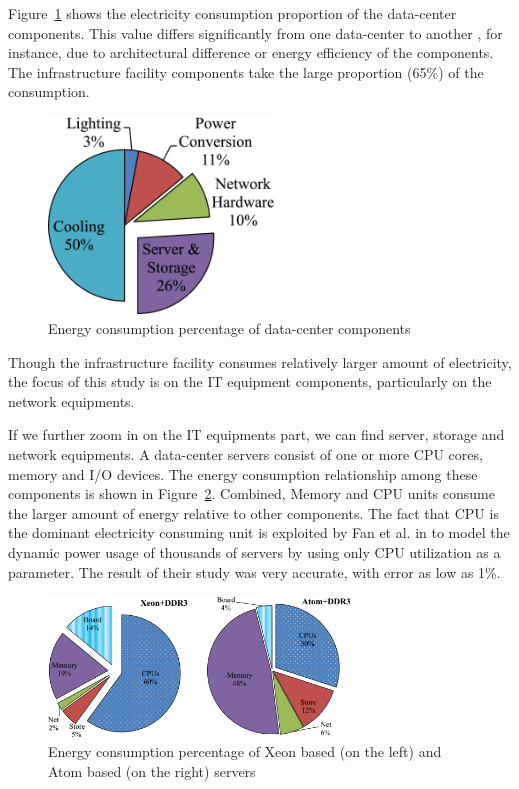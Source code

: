 Figure~\ref{fig:datacenterenergy} \cite{DBLP:journals/comsur/DayarathnaWF16} shows the electricity consumption proportion of the data-center components. This value differs significantly from one data-center to another \cite{DBLP:series/synthesis/2013Barroso}, for instance, due to architectural difference\cite{DBLP:conf/eenergy/GyarmatiT10} or energy efficiency of the components. The infrastructure facility components take the large proportion (65\%) of the consumption. 

\begin{figure}[ht]
	\begin{center}
		\includegraphics[width=6cm]{images/datacenterenergy.png}
		\caption{Energy consumption percentage of data-center components}
		\label{fig:datacenterenergy}
	\end{center}
\end{figure}
Though the infrastructure facility consumes relatively larger amount of electricity, the focus of this study is on the IT equipment components, particularly on the network equipments. 

If we further zoom in on the IT equipments part, we can find server, storage and network equipments. A data-center servers consist of one or more CPU cores, memory and I/O devices. The energy consumption relationship among these components is shown in Figure~\ref{fig:serverenergy}. Combined, Memory and CPU units consume the larger amount of energy relative to other components. The fact that CPU is the dominant electricity consuming unit is exploited by Fan et al. in \cite{DBLP:conf/isca/FanWB07} to model the dynamic power usage of thousands of servers by using only CPU utilization as a parameter. The result of their study was very accurate, with error as low as 1\%. 
\begin{figure}[ht]
	\begin{center}
		\includegraphics[width=8cm]{images/serverenergy.png}
		\caption{Energy consumption percentage of Xeon based (on the left) and Atom based (on the right) servers}
		\label{fig:serverenergy}
	\end{center}
\end{figure}
